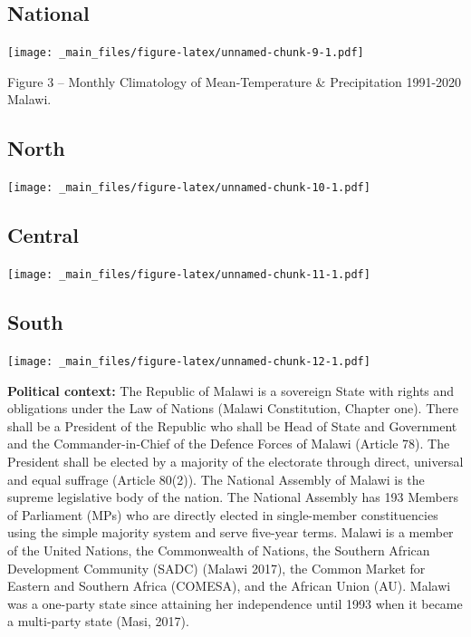 \documentclass[
]{book}
\begin{document}
\hypertarget{national}{%
\subsection{National}\label{national}}

\texttt{[image: \_main\_files/figure-latex/unnamed-chunk-9-1.pdf]}

Figure 3 -- Monthly Climatology of Mean-Temperature \& Precipitation 1991-2020 Malawi.

\hypertarget{north}{%
\subsection{North}\label{north}}

\texttt{[image: \_main\_files/figure-latex/unnamed-chunk-10-1.pdf]}

\hypertarget{central}{%
\subsection{Central}\label{central}}

\texttt{[image: \_main\_files/figure-latex/unnamed-chunk-11-1.pdf]}

\hypertarget{south}{%
\subsection{South}\label{south}}

\texttt{[image: \_main\_files/figure-latex/unnamed-chunk-12-1.pdf]}

\textbf{Political context:} The Republic of Malawi is a sovereign State with rights and obligations under the Law of Nations (Malawi Constitution, Chapter one). There shall be a President of the Republic who shall be Head of State and Government and the Commander-in-Chief of the Defence Forces of Malawi (Article 78). The President shall be elected by a majority of the electorate through direct, universal and equal suffrage (Article 80(2)). The National Assembly of Malawi is the supreme legislative body of the nation. The National Assembly has 193 Members of Parliament (MPs) who are directly elected in single-member constituencies using the simple majority system and serve five-year terms. Malawi is a member of the United Nations, the Commonwealth of Nations, the Southern African Development Community (SADC) (Malawi 2017), the Common Market for Eastern and Southern Africa (COMESA), and the African Union (AU). Malawi was a one-party state since attaining her independence until 1993 when it became a multi-party state (Masi, 2017).
\end{document}
